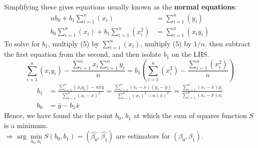 \documentclass[a4paper, 10pt]{article}
\theoremstyle{definition}	%
\begin{document}
Simplifying these gives equations usually known as the \textbf{normal equations}:
    \begin{align}
        nb_0 + b_1\sum_{i=1}^{n} \left(x_i\right) &= \sum_{i=1}^{n} \left(y_i\right)\\
        b_0\sum_{i=1}^{n} \left(x_i\right) + b_1\sum_{i=1}^{n} \left(x_i^2\right) &= \sum_{i=1}^{n} \left(x_i y_i\right)
    \end{align}
To solve for $b_1$, multiply (5) by $\sum_{i=1}^{n} \left(x_i\right)$, multiply (5) by $1/n$. then subtract the first equation from the second, and then isolate $b_1$ on the LHS.
\begin{equation*}
    \sum_{i=1}^{n} \left(x_i y_i\right) - \frac{\sum_{i=1}^{n} x_i \sum_{i=1}^{n}y_i}{n} = b_1\left(\sum_{i=1}^{n} \left(x_i^2\right)- \frac{\sum_{i=1}^{n} \left(x_i^2\right)}{n}\right)
\end{equation*}
\begin{align}
    b_1 &= \frac{\sum_{i=1}^{n} \left(x_i y_i\right) - n\bar{x}\bar{y}}{\sum_{i=1}^{n}\left(x_i - \bar{x}\right)^2} 
        = \frac{\sum_{i=1}^{n}\left(x_i - \bar{x}\right) \left(y_i - \bar{y}\right)}{\sum_{i=1}^{n} (x_i)^2 - n (\bar{x})^2}
        = \frac{\sum_{i=1}^{n}\left(x_i - \bar{x}\right) y_i}{\sum_{i=1}^{n} \left(x_i - \bar{x}\right)x_i}\\
    b_0 &= \bar{y} - b_1\bar{x}
\end{align}
Hence, we have found the the point $b_0$, $b_1$ at which the sum of squares function $S$ is a minimum.\\
$\Rightarrow \arg\min\limits_{b_0, b_1} S(b_0, b_1) = (\hat{\beta_0}, \hat{\beta_1})$ are estimators for $(\beta_0, \beta_1)$.
\end{document}
